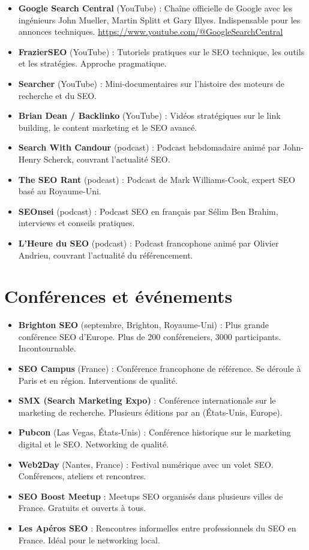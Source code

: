 \documentclass[12pt,a4paper,twoside]{report}
\begin{document}
\begin{itemize}
    \item \textbf{Google Search Central} (YouTube) : Chaîne officielle de Google avec les ingénieurs John Mueller, Martin Splitt et Gary Illyes. Indispensable pour les annonces techniques. \url{https://www.youtube.com/@GoogleSearchCentral}
    \item \textbf{FrazierSEO} (YouTube) : Tutoriels pratiques sur le SEO technique, les outils et les stratégies. Approche pragmatique.
    \item \textbf{Searcher} (YouTube) : Mini-documentaires sur l'histoire des moteurs de recherche et du SEO.
    \item \textbf{Brian Dean / Backlinko} (YouTube) : Vidéos stratégiques sur le link building, le content marketing et le SEO avancé.
    \item \textbf{Search With Candour} (podcast) : Podcast hebdomadaire animé par John-Henry Scherck, couvrant l'actualité SEO.
    \item \textbf{The SEO Rant} (podcast) : Podcast de Mark Williams-Cook, expert SEO basé au Royaume-Uni.
    \item \textbf{SEOnsei} (podcast) : Podcast SEO en français par Sélim Ben Brahim, interviews et conseils pratiques.
    \item \textbf{L'Heure du SEO} (podcast) : Podcast francophone animé par Olivier Andrieu, couvrant l'actualité du référencement.
\end{itemize}

\section*{Conférences et événements}

\begin{itemize}
    \item \textbf{Brighton SEO} (septembre, Brighton, Royaume-Uni) : Plus grande conférence SEO d'Europe. Plus de 200 conférenciers, 3000 participants. Incontournable.
    \item \textbf{SEO Campus} (France) : Conférence francophone de référence. Se déroule à Paris et en région. Interventions de qualité.
    \item \textbf{SMX (Search Marketing Expo)} : Conférence internationale sur le marketing de recherche. Plusieurs éditions par an (États-Unis, Europe).
    \item \textbf{Pubcon} (Las Vegas, États-Unis) : Conférence historique sur le marketing digital et le SEO. Networking de qualité.
    \item \textbf{Web2Day} (Nantes, France) : Festival numérique avec un volet SEO. Conférences, ateliers et rencontres.
    \item \textbf{SEO Boost Meetup} : Meetups SEO organisés dans plusieurs villes de France. Gratuits et ouverts à tous.
    \item \textbf{Les Apéros SEO} : Rencontres informelles entre professionnels du SEO en France. Idéal pour le networking local.
\end{itemize}
\end{document}
